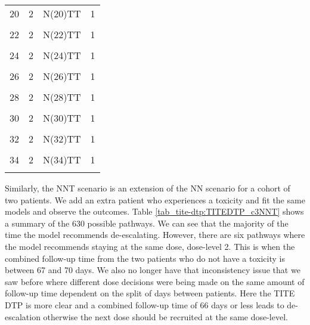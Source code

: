 \begin{table}[H]
{\begin{tabular}[t]{cccc}
			20 & 2 & N(20)TT & 1\\
			\cellcolor{gray!6}{21} & \cellcolor{gray!6}{2} & \cellcolor{gray!6}{N(21)TT} & \cellcolor{gray!6}{1}\\
			22 & 2 & N(22)TT & 1\\
			\cellcolor{gray!6}{23} & \cellcolor{gray!6}{2} & \cellcolor{gray!6}{N(23)TT} & \cellcolor{gray!6}{1}\\
			24 & 2 & N(24)TT & 1\\
			\cellcolor{gray!6}{25} & \cellcolor{gray!6}{2} & \cellcolor{gray!6}{N(25)TT} & \cellcolor{gray!6}{1}\\
			26 & 2 & N(26)TT & 1\\
			\cellcolor{gray!6}{27} & \cellcolor{gray!6}{2} & \cellcolor{gray!6}{N(27)TT} & \cellcolor{gray!6}{1}\\
			28 & 2 & N(28)TT & 1\\
			\cellcolor{gray!6}{29} & \cellcolor{gray!6}{2} & \cellcolor{gray!6}{N(29)TT} & \cellcolor{gray!6}{1}\\
			30 & 2 & N(30)TT & 1\\
			\cellcolor{gray!6}{31} & \cellcolor{gray!6}{2} & \cellcolor{gray!6}{N(31)TT} & \cellcolor{gray!6}{1}\\
			32 & 2 & N(32)TT & 1\\
			\cellcolor{gray!6}{33} & \cellcolor{gray!6}{2} & \cellcolor{gray!6}{N(33)TT} & \cellcolor{gray!6}{1}\\
			34 & 2 & N(34)TT & 1\\
			\cellcolor{gray!6}{35} & \cellcolor{gray!6}{2} & \cellcolor{gray!6}{NTT} & \cellcolor{gray!6}{1}\\
			\bottomrule
	\end{tabular}}
\end{table}

Similarly, the NNT scenario is an extension of the NN scenario for a cohort of two patients. We add an extra patient who experiences a toxicity and fit the same models and observe the outcomes. Table \ref{tab_tite-dtp:TITEDTP_c3NNT} shows a summary of the 630 possible pathways. We can see that the majority of the time the model recommends de-escalating. However, there are six pathways where the model recommends staying at the same dose, dose-level 2. This is when the combined follow-up time from the two patients who do not have a toxicity is between 67 and 70 days. We also no longer have that inconsistency issue that we saw before where different dose decisions were being made on the same amount of follow-up time dependent on the split of days between patients. Here the TITE DTP is more clear and a combined follow-up time of 66 days or less leads to de-escalation otherwise the next dose should be recruited at the same dose-level.

